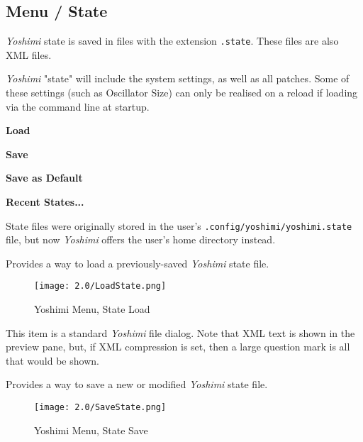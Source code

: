 \subsection{Menu / State}
\label{subsec:menu_state}

   \textsl{Yoshimi} state is saved in files with the extension
   \texttt{.state}.  These files are also XML files.

   \textsl{Yoshimi} "state" will include the system settings, as well as all
   patches. Some of these settings (such as Oscillator Size) can only be
   realised on a reload if loading via the command line at startup.


   \begin{enumber}
      \item \textbf{Load}
      \item \textbf{Save}
      \item \textbf{Save as Default}
      \item \textbf{Recent States...}
   \end{enumber}

   State files were originally stored in the
   user's \texttt{.config/yoshimi/yoshimi.state} file, but
   now \textsl{Yoshimi} offers the user's home directory instead.

   \setcounter{ItemCounter}{0}      %

   Provides a way to load a previously-saved \textsl{Yoshimi} state file.

\begin{figure}[H]
   \centering
   \texttt{[image: 2.0/LoadState.png]}
   \caption{Yoshimi Menu, State Load}
   \label{fig:yoshimi_menu_state_load}
\end{figure}

   This item is a standard \textsl{Yoshimi} file dialog.
   Note that XML text is shown in the preview pane, but, if XML compression is
   set, then a large question mark is all that would be shown.

   Provides a way to save a new or modified \textsl{Yoshimi} state file.

\begin{figure}[H]
   \centering
   \texttt{[image: 2.0/SaveState.png]}
   \caption{Yoshimi Menu, State Save}
   \label{fig:yoshimi_menu_state_save}
\end{figure}


